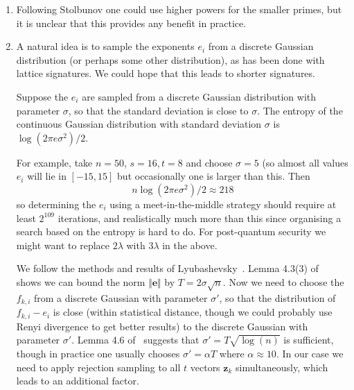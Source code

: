 \documentclass{llncs}
\renewcommand{\l}{\mathfrak{l}}
\newcommand{\e}{\mathbf{e}}
\newcommand{\z}{\mathbf{z}}
\begin{document}
\begin{enumerate}
\item Following Stolbunov one could use higher powers for the smaller primes, but it is unclear that this provides any benefit in practice.





\item A natural idea is to sample the exponents $e_i$ from a discrete Gaussian distribution (or perhaps some other distribution), as has been done with lattice signatures. We could hope that this leads to shorter signatures.

Suppose the $e_i$ are sampled from a discrete Gaussian distribution with parameter $\sigma$, so that the standard deviation is close to $\sigma$. The entropy of the continuous Gaussian distribution with standard deviation $\sigma$ is $\log( 2 \pi e \sigma^2 )/2$.

For example, take $n=50$, $s = 16, t = 8$ and choose $\sigma = 5$ (so almost all values $e_{i}$ will lie in $[-15,15]$ but occasionally one is larger than this. Then
\[
   n \log( 2 \pi e \sigma^2 )/2 \approx 218
\]
so determining the $e_i$ using a meet-in-the-middle strategy should require at least $2^{109}$ iterations, and realistically much more than this since organising a search based on the entropy is hard to do. For post-quantum security we might want to replace $2 \lambda$ with $3\lambda$ in the above.

We follow the methods and results of Lyubashevsky~\cite{Lyu12}. Lemma 4.3(3) of~\cite{Lyu12} shows we can bound the norm $\Vert \e \Vert$ by $T = 2 \sigma \sqrt{n}$.
Now we need to choose the $f_{k,i}$ from a discrete Gaussian with parameter $\sigma'$, so that the distribution of $f_{k,i} - e_i$ is close (within statistical distance, though we could probably use Renyi divergence to get better results) to the discrete Gaussian with parameter $\sigma'$.
Lemma 4.6 of~\cite{Lyu12} suggests that $\sigma' = T \sqrt{\log(n)}$ is sufficient, though in practice one usually chooses $\sigma' = \alpha T $ where $\alpha \approx 10$.
In our case we need to apply rejection sampling to all $t$ vectors $\z_k$ simultaneously,
which leads to an additional factor.


\end{enumerate}
\end{document}
